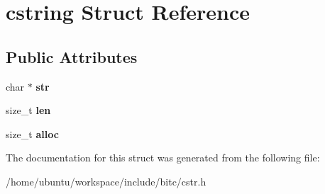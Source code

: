 \hypertarget{structcstring}{\section{cstring Struct Reference}
\label{structcstring}
}
\subsection*{Public Attributes}
\begin{DoxyCompactItemize}
\item 
\hypertarget{structcstring_a731cdf51b981dfd0c66713e2c942a43d}{char $\ast$ {\bfseries str}}\label{structcstring_a731cdf51b981dfd0c66713e2c942a43d}

\item 
\hypertarget{structcstring_ad0eb3a0fea291824cc3a7176a4d6a345}{size\-\_\-t {\bfseries len}}\label{structcstring_ad0eb3a0fea291824cc3a7176a4d6a345}

\item 
\hypertarget{structcstring_a5d0c6d93ac71cc14384bcf732ea07092}{size\-\_\-t {\bfseries alloc}}\label{structcstring_a5d0c6d93ac71cc14384bcf732ea07092}

\end{DoxyCompactItemize}


The documentation for this struct was generated from the following file\-:\begin{DoxyCompactItemize}
\item 
/home/ubuntu/workspace/include/bitc/cstr.\-h\end{DoxyCompactItemize}
